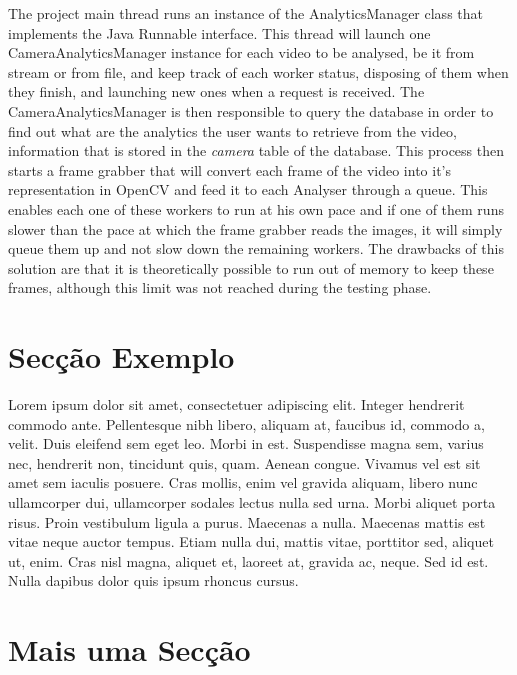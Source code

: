The project main thread runs an instance of the AnalyticsManager class that implements the Java Runnable interface. This thread will launch one CameraAnalyticsManager instance for each video to be analysed, be it from stream or from file, and keep track of each worker status, disposing of them when they finish, and launching new ones when a request is received. The CameraAnalyticsManager is then responsible to query the database in order to find out what are the analytics the user wants to retrieve from the video, information that is stored in the \textit{camera} table of the database. This process then starts a frame grabber that will convert each frame of the video into it's representation in OpenCV and feed it to each Analyser through a queue. This enables each one of these workers to run at his own pace and if one of them runs slower than the pace at which the frame grabber reads the images, it will simply queue them up and not slow down the remaining workers. The drawbacks of this solution are that it is theoretically possible to run out of memory to keep these frames, although this limit was not reached during the testing phase.

\section{Secção Exemplo}


Lorem ipsum dolor sit amet, consectetuer adipiscing elit. Integer
hendrerit commodo ante. Pellentesque nibh libero, aliquam at, faucibus
id, commodo a, velit. 
Duis eleifend sem eget leo. Morbi in est. Suspendisse magna sem,
varius nec, hendrerit non, tincidunt quis, quam. Aenean congue. 
Vivamus vel est sit amet sem iaculis posuere. Cras mollis, enim vel
gravida aliquam, libero nunc ullamcorper dui, ullamcorper sodales
lectus nulla sed urna. Morbi aliquet porta risus. 
Proin vestibulum ligula a purus. Maecenas a nulla. 
Maecenas mattis est vitae neque auctor tempus. Etiam nulla dui,
mattis vitae, porttitor sed, aliquet ut, enim. Cras nisl magna,
aliquet et, laoreet at, gravida ac, neque. Sed id est. Nulla dapibus
dolor quis ipsum rhoncus cursus. 

\section{Mais uma Secção}

